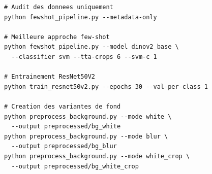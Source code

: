 \documentclass[12pt,a4paper]{report}
\begin{document}
\begin{lstlisting}
# Audit des donnees uniquement
python fewshot_pipeline.py --metadata-only

# Meilleure approche few-shot
python fewshot_pipeline.py --model dinov2_base \
  --classifier svm --tta-crops 6 --svm-c 1

# Entrainement ResNet50V2
python train_resnet50v2.py --epochs 30 --val-per-class 1

# Creation des variantes de fond
python preprocess_background.py --mode white \
  --output preprocessed/bg_white
python preprocess_background.py --mode blur \
  --output preprocessed/bg_blur
python preprocess_background.py --mode white_crop \
  --output preprocessed/bg_white_crop
\end{lstlisting}
\end{document}

